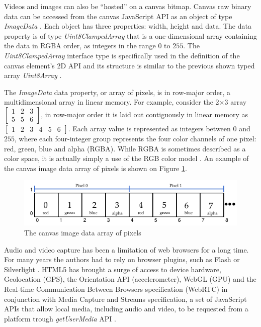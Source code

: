  Videos and images can also be ``hosted'' on a canvas bitmap. Canvas raw binary data can be accessed from the canvas JavaScript API as an object of type \textit{ImageData} \cite{Canvas2013}. Each object has three properties: width, height and data. The data property is of type \textit{Uint8ClampedArray} that is a one-dimensional array containing the data in RGBA order, as integers in the range $0$ to $255$. The \textit{Uint8ClampedArray} interface type is specifically used in the definition of the canvas element's 2D API and its structure is  similar to the previous shown typed array \textit{Uint8Array} \cite{Canvas2013} \cite{TypedArray2013}.

The \textit{ImageData} data property, or array of pixels, is in row-major order, a multidimensional array in linear memory. For example, consider the 2×3 array $\begin{bmatrix}
1 & 2 & 3\\
5 & 5 & 6
\end{bmatrix}$, in row-major order it is laid out contiguously in linear memory as $\begin{bmatrix}
1 & 2 & 3 & 4 & 5 & 6
\end{bmatrix}$. Each array value is represented as integers between $0$ and $255$, where each four-integer group represents the four color channels of one pixel: red, green, blue and alpha (RGBA). While RGBA is sometimes described as a color space, it is actually simply a use of the RGB color model \cite{Gonzalez2007}. An example of the canvas image data array of pixels is shown on Figure \ref{figure:imagedata_array}.

\begin{figure}[!htb]
  \centering
  \includegraphics[width=\linewidth]{chapters/basic_concepts/imagedata_array.pdf}
  \caption{The canvas image data array of pixels}
  \label{figure:imagedata_array}
\end{figure}

Audio and video capture has been a limitation of web browsers for a long time. For many years the authors had to rely on browser plugins, such as Flash \cite{Flash2013} or Silverlight \cite{Silverlight2013} \cite{Rocks2013}. HTML5 has brought a surge of access to device hardware, Geolocation (GPS), the Orientation API (accelerometer), WebGL (GPU) and the Real-time Communication Between Browsers specification (WebRTC) in conjunction with Media Capture and Streams specification, a set of JavaScript APIs that allow local media, including audio and video, to be requested from a platform trough \textit{getUserMedia} API \cite{WC2006}.

